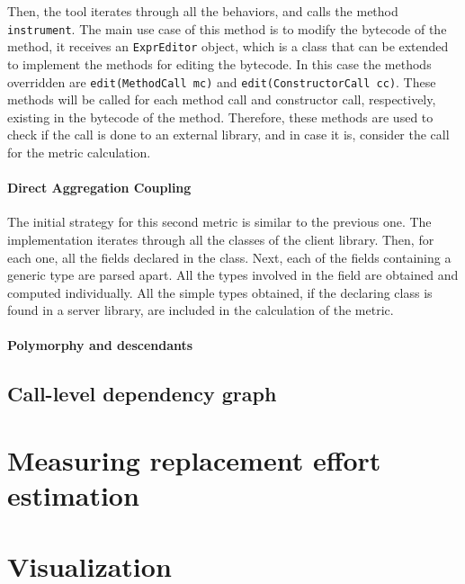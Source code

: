 Then, the tool iterates through all the behaviors, and calls the method \texttt{instrument}. The main use case of this method is to modify the bytecode of the method, it receives an \texttt{ExprEditor} object, which is a class that can be extended to implement the methods for editing the bytecode. In this case the methods overridden are \texttt{edit(MethodCall mc)} and \texttt{edit(ConstructorCall cc)}. These methods will be called for each method call and constructor call, respectively, existing in the bytecode of the method. Therefore, these methods are used to check if the call is done to an external library, and in case it is, consider the call for the metric calculation.

\paragraph{Direct Aggregation Coupling}
The initial strategy for this second metric is similar to the previous one. The implementation iterates through all the classes of the client library. Then, for each one, all the fields declared in the class. Next, each of the fields containing a generic type are parsed apart. All the types involved in the field are obtained and computed individually. All the simple types obtained, if the declaring class is found in a server library, are included in the calculation of the metric.

\paragraph{Polymorphy and descendants}


\subsection{Call-level dependency graph}


\section{Measuring replacement effort estimation}

\section{Visualization}
